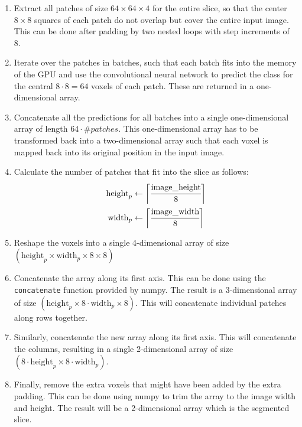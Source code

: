 \documentclass[12pt,a4paper,twoside,openright]{report}
\begin{document}
\begin{enumerate}
	\item Extract all patches of size $64 \times 64 \times 4$ for the entire slice, so that the center $8 \times 8$ squares of each patch do not overlap but cover the entire input image. This can be done after padding by two nested loops with step increments of 8.
	\item Iterate over the patches in batches, such that each batch fits into the memory of the GPU and use the convolutional neural network to predict the class for the central $8 \cdot 8 = 64$ voxels of each patch. These are returned in a one-dimensional array.
	\item Concatenate all the predictions for all batches into a single one-dimensional array of length $64 \cdot \#patches$. This one-dimensional array has to be transformed back into a two-dimensional array such that each voxel is mapped back into its original position in the input image.
	\item Calculate the number of patches that fit into the slice as follows:
		\begin{equation}
		\begin{split}
			\text{height}_p & \gets \bigg \lceil \cfrac{\text{image\_height}}{8} \bigg \rceil 	 \\
			\text{width}_p & \gets \bigg \lceil \cfrac{\text{image\_width}}{8} \bigg \rceil 	 \\
		\end{split}		
		\end{equation}
	\item Reshape the voxels into a single 4-dimensional array of size $(\text{height}_p \times \text{width}_p \times 8 \times 8)$
	\item Concatenate the array along its first axis. This can be done using the \texttt{concatenate} function provided by numpy. The result is a 3-dimensional array of size $(\text{height}_p \times 8 \cdot \text{width}_p \times 8)$. This will concatenate individual patches along rows together.
	\item Similarly, concatenate the new array along its first axis. This will concatenate the columns, resulting in a single 2-dimensional array of size $(8 \cdot \text{height}_p \times 8 \cdot \text{width}_p)$.
	\item Finally, remove the extra voxels that might have been added by the extra padding. This can be done using numpy to trim the array to the image width and height. The result will be a 2-dimensional array which is the segmented slice.
\end{enumerate}
\end{document}
